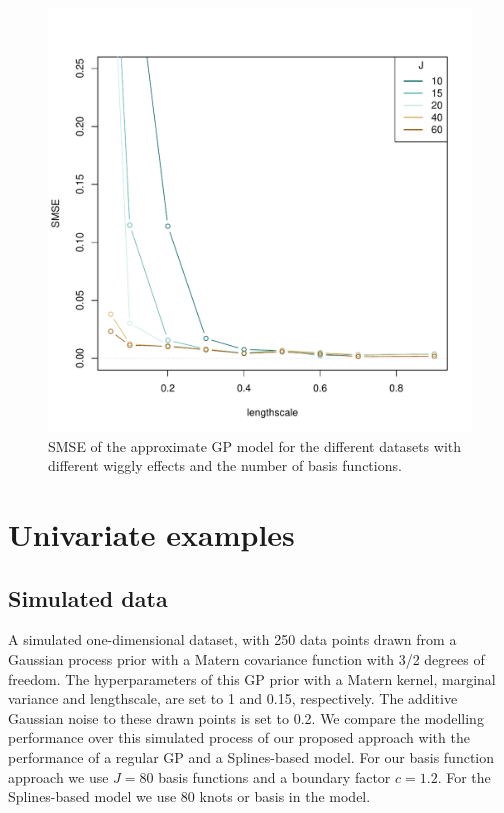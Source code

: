 \documentclass[]{interact}
\theoremstyle{plain}%
\theoremstyle{definition}
\theoremstyle{remark}
\begin{document}
\begin{figure}[H]
\centering
\includegraphics[scale=0.5]{fig9_MSE_varing_lscale.pdf}
\caption{SMSE of the approximate GP model for the different datasets with different wiggly effects and the number of basis functions.}
  \label{fig9_MSE_varing_lscale}
\end{figure}


\vspace{3mm}
\section{Univariate examples}\label{sec:gp_examples1D}


\subsection{Simulated data}

A simulated one-dimensional dataset, with 250 data points drawn from a Gaussian process prior with a Matern covariance function with 3/2 degrees of freedom. The hyperparameters of this GP prior with a Matern kernel, marginal variance and lengthscale, are set to 1 and 0.15, respectively. The additive Gaussian noise to these drawn points is set to 0.2. We compare the modelling performance over this simulated process of our proposed approach with the performance of a regular GP and a Splines-based model. For our basis function approach we use $J=80$ basis functions and a boundary factor $c=1.2$. For the Splines-based model we use 80 knots or basis in the model.
\end{document}

